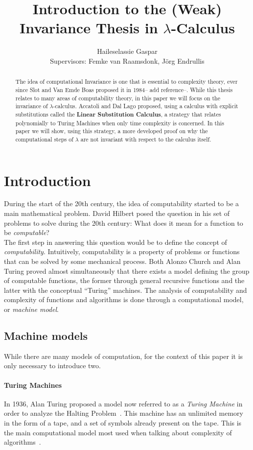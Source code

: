 \documentclass[12pt]{article}
\title{Introduction to the (Weak) Invariance Thesis in $\lambda$-Calculus}
\author{Haileselassie Gaspar\\[1cm]{\small Supervisors: Femke van Raamsdonk, Jörg Endrullis}}
\begin{document}
\maketitle
\begin{abstract}
  The idea of computational Invariance is one that is essential to complexity theory, ever since Slot and Van Emde Boas proposed it in 1984-- add reference--. While this thesis relates to many areas of computability theory, in this paper we will focus on the invariance of $\lambda$-calculus. Accatoli and Dal Lago proposed, using a calculus with explicit substitutions called the \textbf{Linear Substitution Calculus}, a strategy that relates polynomially to Turing Machines when only time complexity is concerned. In this paper we will show, using this strategy, a more developed proof on why the computational steps of $\lambda$ are not invariant with respect to the calculus itself.\end{abstract}
\section{Introduction}
During the start of the 20th century, the idea of computability started to be a main mathematical problem. David Hilbert posed the question in his set of problems to solve during the 20th century: What does it mean for a function to be \textit{computable}? \\
The first step in answering this question would be to define the concept of \textit{computability}. Intuitively, computability is a property of problems or functions that can be solved by some mechanical process. Both Alonzo Church and Alan Turing proved almost simultaneously that there exists a model defining the group of computable functions, the former through general recursive functions and the latter with the conceptual \enquote{Turing} machines.
The analysis of computability and complexity of functions and algorithms is done through a computational model, or \textit{machine model}.
\subsection{Machine models}
While there are many models of computation, for the context of this paper it is only necessary to introduce two.

\paragraph{Turing Machines}
In 1936, Alan Turing proposed a model now referred to as a \textit{Turing Machine} in order to analyze the Halting Problem~\cite{on-computable-numbers}. This machine has an unlimited memory in the form of a tape, and a set of symbols already present on the tape. This is the main computational model most used when talking about complexity of algorithms~\cite{computation-theory}.
\end{document}
